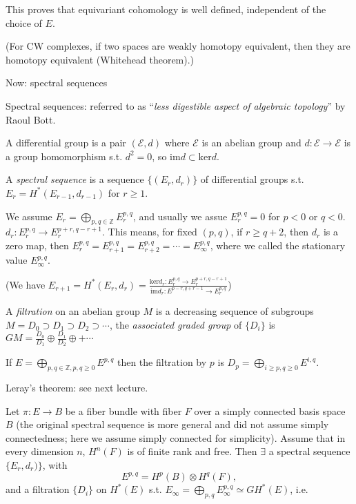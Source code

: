 \documentclass{article}
\theoremstyle{mystyle}
\theoremstyle{remark}
\numberwithin{equation}{section}
\begin{document}
This proves that equivariant cohomology is well defined, independent of the choice of $E$. 


(For CW complexes, if two spaces are weakly homotopy equivalent, then they are homotopy equivalent (Whitehead theorem).)










Now: spectral sequences







Spectral sequences: referred to as ``\emph{less digestible aspect of algebraic topology}'' by Raoul Bott.





A differential group is a pair $(\mathcal{E},d)$ where $\mathcal{E}$ is an abelian group and $d\colon \mathcal{E}\rightarrow \mathcal{E}$ is a group homomorphism s.t. $d^2 = 0$, so $\mathrm{im}d\subset \mathrm{ker}d$. 

A \emph{spectral sequence} is a sequence $\{(E_r,d_r)\}$ of differential groups s.t. $E_r = H^*(E_{r-1},d_{r-1})$ for $r\geq 1$. 

We assume $E_r = \bigoplus_{p,q \in \mathbb{Z}} E_r^{p,q}$, and usually we assue $E_r^{p,q} = 0$ for $p<0$ or $q<0$. $d_r\colon E_r^{p,q}\rightarrow E_r^{p+r,q-r+1}$. This means, for fixed $(p,q)$, if $r\geq q+2$, then $d_r$ is a zero map, then $E_r^{p,q} = E_{r+1}^{p,q} = E_{r+2}^{p,q} = \cdots =  E_\infty^{p,q}$, where we called the stationary value $E_\infty^{p,q}$. 

(We have $E_{r+1} = H^*(E_r,d_r) = \frac{\mathrm{ker}d_r\colon E^{p,q}_r\rightarrow E_r^{p+r,q-r+1}}{\mathrm{im}d_r\colon  E^{p-r,q+r-1}\rightarrow E_r^{p,q}}$)


A \emph{filtration} on an abelian group $M$ is a decreasing sequence of subgroups $M = D_0\supset D_1\supset D_2 \supset \cdots$, the \emph{associated graded group} of $\{D_i\}$ is $GM = \frac{D_0}{D_1}\oplus \frac{D_1}{D_2}\oplus + \cdots$ 


If $E = \bigoplus_{p,q\in \mathbb{Z},p,q\geq 0}E^{p,q}$ then the filtration by $p$ is $D_p = \bigoplus_{i\geq p,q\geq 0} E^{i,q}$. 

Leray's theorem: see next lecture.

Let $\pi\colon E\rightarrow B$ be a fiber bundle with fiber $F$ over a simply connected basis space $B$ (the original spectral sequence is more general and did not assume simply connectedness; here we assume simply connected for simplicity). Assume that in every dimension $n$, $H^n(F)$ is of finite rank and free. Then $\exists$ a spectral sequence $\{E_r,d_r)\}$, with
$$E^{p,q} = H^p(B)\otimes H^q(F),$$
and a filtration $\{D_i\}$ on $H^*(E)$ s.t. $E_\infty = \bigoplus_{p,q} E^{p,q}_\infty \simeq GH^*(E)$, i.e. 
\end{document}

